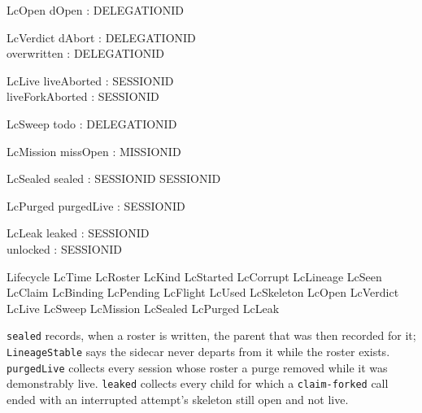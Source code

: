 \documentclass[a4paper,10pt,fleqn]{article}
\newcommand{\field}[1]{\texttt{#1}}
\begin{document}
\begin{schema}{LcOpen}
dOpen : \power DELEGATIONID
\end{schema}

\begin{schema}{LcVerdict}
dAbort : \power DELEGATIONID \\
overwritten : \power DELEGATIONID
\end{schema}

\begin{schema}{LcLive}
liveAborted : \power SESSIONID \\
liveForkAborted : \power SESSIONID
\end{schema}

\begin{schema}{LcSweep}
todo : \power DELEGATIONID
\end{schema}

\begin{schema}{LcMission}
missOpen : \power MISSIONID
\end{schema}

\begin{schema}{LcSealed}
sealed : SESSIONID \pfun \power SESSIONID
\end{schema}

\begin{schema}{LcPurged}
purgedLive : \power SESSIONID
\end{schema}

\begin{schema}{LcLeak}
leaked : \power SESSIONID \\
unlocked : \power SESSIONID
\end{schema}

\begin{zed}
Lifecycle  LcTime \land LcRoster \land LcKind \land LcStarted \land LcCorrupt \land LcLineage \land LcSeen \land LcClaim \land LcBinding \land LcPending \land LcFlight \land LcUsed \land LcSkeleton \land LcOpen \land LcVerdict \land LcLive \land LcSweep \land LcMission \land LcSealed \land LcPurged \land LcLeak
\end{zed}



\field{sealed} records, when a roster is written, the parent that was then
recorded for it; \field{LineageStable} says the sidecar never departs from
it while the roster exists. \field{purgedLive} collects every session whose
roster a purge removed while it was demonstrably live. \field{leaked}
collects every child for which a \field{claim-forked} call ended with an
interrupted attempt's skeleton still open and not live.
\end{document}
